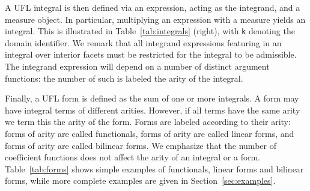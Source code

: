 \documentclass[prodmode,acmtoms]{acmsmall}
\newcommand{\uflc}[1]{\texttt{#1}}
\begin{document}
A UFL integral is then defined via an expression, acting as the
integrand, and a measure object. In particular, multiplying an
expression with a measure yields an integral. This is illustrated in
Table~\ref{tab:integrals} (right), with \uflc{k} denoting the domain
identifier. We remark that all integrand expressions featuring in an
integral over interior facets must be restricted for the integral to
be admissible. The integrand expression will depend on a number of
distinct argument functions: the number of such is labeled the arity
of the integral.

Finally, a UFL form is defined as the sum of one or more integrals. A
form may have integral terms of different arities. However, if all
terms have the same arity  we term this  the arity of the
form.  Forms are labeled according to their arity: forms of arity 
are called functionals, forms of arity  are called linear forms, and
forms of arity  are called bilinear forms. We emphasize that the
number of coefficient functions does not affect the arity of an
integral or a form. Table~\ref{tab:forms} shows simple examples of
functionals, linear forms and bilinear forms, while more complete
examples are given in Section~\ref{sec:examples}.
\end{document}
